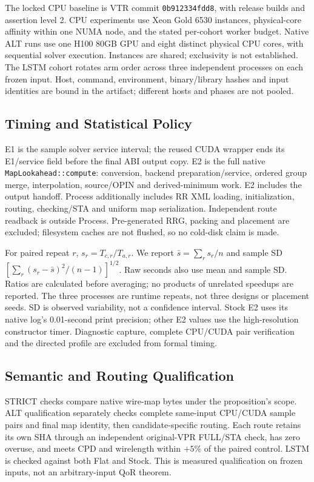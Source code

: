 \documentclass[conference,10pt,letterpaper]{IEEEtran}
\begin{document}
The locked CPU baseline is VTR commit \texttt{0b912334fdd8}, with release builds and assertion level 2. CPU experiments use Xeon Gold 6530 instances, physical-core affinity within one NUMA node, and the stated per-cohort worker budget. Native ALT runs use one H100 80GB GPU and eight distinct physical CPU cores, with sequential solver execution. Instances are shared; exclusivity is not established. The LSTM cohort rotates arm order across three independent processes on each frozen input. Host, command, environment, binary/library hashes and input identities are bound in the artifact; different hosts and phases are not pooled.

\subsection{Timing and Statistical Policy}
E1 is the sample solver service interval; the reused CUDA wrapper ends its E1/service field before the final ABI output copy. E2 is the full native \texttt{MapLookahead::compute}: conversion, backend preparation/service, ordered group merge, interpolation, source/OPIN and derived-minimum work. E2 includes the output handoff. Process additionally includes RR XML loading, initialization, routing, checking/STA and uniform map serialization. Independent route readback is outside Process. Pre-generated RRG, packing and placement are excluded; filesystem caches are not flushed, so no cold-disk claim is made.

For paired repeat $r$, $s_r=T_{c,r}/T_{a,r}$. We report $\bar s=\sum_rs_r/n$ and sample SD $[\sum_r(s_r-\bar s)^2/(n-1)]^{1/2}$. Raw seconds also use mean and sample SD. Ratios are calculated before averaging; no products of unrelated speedups are reported. The three processes are runtime repeats, not three designs or placement seeds. SD is observed variability, not a confidence interval. Stock E2 uses its native log's 0.01-second print precision; other E2 values use the high-resolution constructor timer. Diagnostic capture, complete CPU/CUDA pair verification and the directed profile are excluded from formal timing.

\subsection{Semantic and Routing Qualification}
STRICT checks compare native wire-map bytes under the proposition's scope. ALT qualification separately checks complete same-input CPU/CUDA sample pairs and final map identity, then candidate-specific routing. Each route retains its own SHA through an independent original-VPR FULL/STA check, has zero overuse, and meets CPD and wirelength within $+5\%$ of the paired control. LSTM is checked against both Flat and Stock. This is measured qualification on frozen inputs, not an arbitrary-input QoR theorem.
\end{document}
